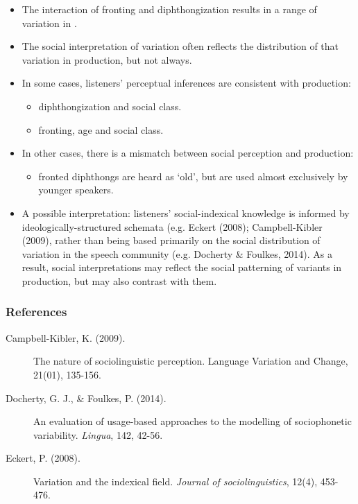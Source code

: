 \documentclass[a0,portrait]{a0poster}
\begin{document}
\begin{multicols*}{3}
\begin{itemize}
\item{The interaction of fronting and diphthongization results in a range of variation in .}
\item{The social interpretation of  variation often reflects the distribution of that variation in production, but not always.}
\item{In some cases, listeners' perceptual inferences are consistent with production:\begin{itemize}\item{diphthongization and social class.}\item{fronting, age and social class.}\end{itemize}}
\item{In other cases, there is a mismatch between social perception and production:\begin{itemize}\item{fronted diphthongs are heard as `old', but are used almost exclusively by younger speakers.}\end{itemize}}
\item{A possible interpretation: listeners' social-indexical knowledge is informed by ideologically-structured schemata (e.g. Eckert (2008); Campbell-Kibler (2009), rather than being based primarily on the social distribution of variation in the speech community (e.g. Docherty \& Foulkes, 2014). As a result, social interpretations may reflect the social patterning of variants in production, but may also contrast with them.}

\end{itemize}

\subsubsection*{References}
\footnotesize
\begin{description}

\item[Campbell-Kibler, K. (2009).]{The nature of sociolinguistic perception. Language Variation and Change, 21(01), 135-156.}

\item[Docherty, G. J., \& Foulkes, P. (2014).]{An evaluation of usage-based approaches to the modelling of sociophonetic variability. \textit{Lingua}, 142, 42-56.}

\item[Eckert, P. (2008).]{Variation and the indexical field. \textit{Journal of sociolinguistics}, 12(4), 453-476.}\vspace*{0.2cm}


\end{description}
\end{multicols*}
\end{document}

